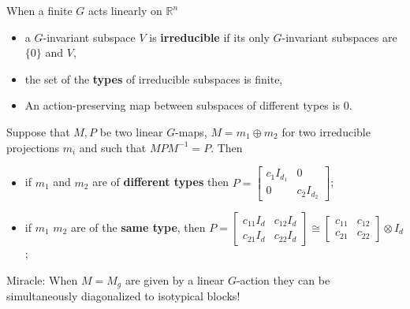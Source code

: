 \documentclass[9pt]{beamer}
\theoremstyle{definition}
\begin{document}
  \begin{frame}
    \begin{block}{When a finite $G$ acts linearly on $\mathbb{R}^n$}
      \pause
      \begin{itemize}
        \item a $G$-invariant subspace $V$ is \textbf{irreducible}
        if its only $G$-invariant subspaces are $\{0\}$ and $V$,
        \item the set of the \textbf{types} of irreducible subspaces is finite,
        \item An action-preserving map between subspaces of different types is $0$.
      \end{itemize}
    \end{block}
    \pause

    \begin{lemma}[Schur]
    Suppose that $M, P$ be two linear $G$-maps, $M = m_1 \oplus m_2$ for two irreducible projections $m_i$
    and such that $MPM^{-1} = P$. Then
    \begin{itemize}
      \pause
      \item if $m_1$ and $m_2$ are of \textbf{different types} then
        $P =
        \begin{bmatrix}
        c_1 I_{d_1} & 0 \\
        0     & c_2 I_{d_2}
        \end{bmatrix}
        $;
      \pause
      \item if $m_1$ $m_2$ are of the \textbf{same type}, then
        $P =
        \begin{bmatrix}
        c_{11} I_d & c_{12} I_d \\
        c_{21} I_d & c_{22} I_d
        \end{bmatrix}
        \cong
        \begin{bmatrix}
        c_{11} & c_{12}\\
        c_{21} & c_{22}
        \end{bmatrix}
        \otimes I_d $;
    \end{itemize}
    \end{lemma}

    \pause
    \alert{Miracle:} When $M = M_g$ are given by a linear $G$-action they can be
    \alert{simultaneously} diagonalized to isotypical blocks!

  \end{frame}
\end{document}
